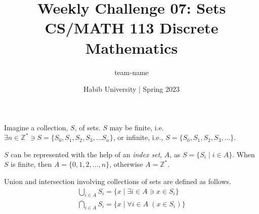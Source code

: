 \documentclass[a4paper]{exam}
\title{Weekly Challenge 07: Sets\\CS/MATH 113 Discrete Mathematics}
\author{team-name}  %
\date{Habib University | Spring 2023}
\newcommand\mbb[1]{\ensuremath{\mathbb{#1}}}
\begin{document}
\maketitle

\begin{questions}

  Imagine a collection, $S$, of sets. $S$ may be finite, i.e. $\exists n\in \mbb{Z}^*\ni S = \{S_0,S_1,S_2, S_3, \ldots S_n\}$, or infinite, i.e., $S = \{S_0,S_1,S_2, S_3, \ldots \}$.

  $S$ can be represented with the help of an \textit{index set}, $A$, as $S = \{S_i\mid i \in A\}$. When $S$ is finite, then $A= \{0,1,2,\ldots,n \}$, otherwise $A=\mbb{Z}^*$.

  Union and intersection involving collections of sets are defined as follows.
  \begin{align*}
    \bigcup_{i \in A}S_i = \{x\mid \exists i \in A \ni x \in S_i\}\\
    \bigcap_{i \in A}S_i = \{x\mid\forall i \in A\; (x \in S_i)\}
  \end{align*}
  
  \begin{solution}
    \end{solution}

\end{questions}
\end{document}
